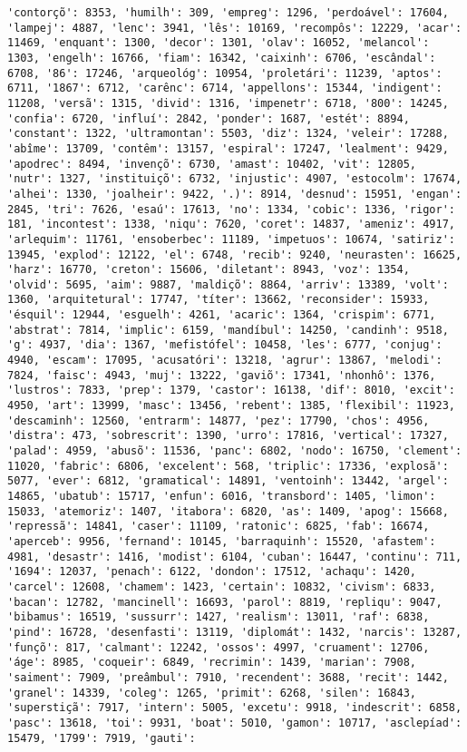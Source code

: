 \documentclass[11pt]{article}
\begin{document}
\begin{Verbatim}[commandchars=\\\{\}]
'contorçõ': 8353, 'humilh': 309, 'empreg': 1296, 'perdoável': 17604, 'lampej': 4887, 'lenc': 3941, 'lês': 10169, 'recompôs': 12229, 'acar': 11469, 'enquant': 1300, 'decor': 1301, 'olav': 16052, 'melancol': 1303, 'engelh': 16766, 'fiam': 16342, 'caixinh': 6706, 'escândal': 6708, '86': 17246, 'arqueológ': 10954, 'proletári': 11239, 'aptos': 6711, '1867': 6712, 'carênc': 6714, 'appellons': 15344, 'indigent': 11208, 'versã': 1315, 'divid': 1316, 'impenetr': 6718, '800': 14245, 'confia': 6720, 'influí': 2842, 'ponder': 1687, 'estét': 8894, 'constant': 1322, 'ultramontan': 5503, 'diz': 1324, 'veleir': 17288, 'abîme': 13709, 'contêm': 13157, 'espiral': 17247, 'lealment': 9429, 'apodrec': 8494, 'invençõ': 6730, 'amast': 10402, 'vit': 12805, 'nutr': 1327, 'instituiçõ': 6732, 'injustic': 4907, 'estocolm': 17674, 'alhei': 1330, 'joalheir': 9422, '.)': 8914, 'desnud': 15951, 'engan': 2845, 'tri': 7626, 'esaú': 17613, 'no': 1334, 'cobic': 1336, 'rigor': 181, 'incontest': 1338, 'niqu': 7620, 'coret': 14837, 'ameniz': 4917, 'arlequim': 11761, 'ensoberbec': 11189, 'impetuos': 10674, 'satiriz': 13945, 'explod': 12122, 'el': 6748, 'recib': 9240, 'neurasten': 16625, 'harz': 16770, 'creton': 15606, 'diletant': 8943, 'voz': 1354, 'olvid': 5695, 'aim': 9887, 'maldiçõ': 8864, 'arriv': 13389, 'volt': 1360, 'arquitetural': 17747, 'títer': 13662, 'reconsider': 15933, 'ésquil': 12944, 'esguelh': 4261, 'acaric': 1364, 'crispim': 6771, 'abstrat': 7814, 'implic': 6159, 'mandíbul': 14250, 'candinh': 9518, 'g': 4937, 'dia': 1367, 'mefistófel': 10458, 'les': 6777, 'conjug': 4940, 'escam': 17095, 'acusatóri': 13218, 'agrur': 13867, 'melodi': 7824, 'faisc': 4943, 'muj': 13222, 'gaviõ': 17341, 'nhonhô': 1376, 'lustros': 7833, 'prep': 1379, 'castor': 16138, 'dif': 8010, 'excit': 4950, 'art': 13999, 'masc': 13456, 'rebent': 1385, 'flexibil': 11923, 'descaminh': 12560, 'entrarm': 14877, 'pez': 17790, 'chos': 4956, 'distra': 473, 'sobrescrit': 1390, 'urro': 17816, 'vertical': 17327, 'palad': 4959, 'abusõ': 11536, 'panc': 6802, 'nodo': 16750, 'clement': 11020, 'fabric': 6806, 'excelent': 568, 'triplic': 17336, 'explosã': 5077, 'ever': 6812, 'gramatical': 14891, 'ventoinh': 13442, 'argel': 14865, 'ubatub': 15717, 'enfun': 6016, 'transbord': 1405, 'limon': 15033, 'atemoriz': 1407, 'itabora': 6820, 'as': 1409, 'apog': 15668, 'repressã': 14841, 'caser': 11109, 'ratonic': 6825, 'fab': 16674, 'aperceb': 9956, 'fernand': 10145, 'barraquinh': 15520, 'afastem': 4981, 'desastr': 1416, 'modist': 6104, 'cuban': 16447, 'continu': 711, '1694': 12037, 'penach': 6122, 'dondon': 17512, 'achaqu': 1420, 'carcel': 12608, 'chamem': 1423, 'certain': 10832, 'civism': 6833, 'bacan': 12782, 'mancinell': 16693, 'parol': 8819, 'repliqu': 9047, 'bibamus': 16519, 'sussurr': 1427, 'realism': 13011, 'raf': 6838, 'pind': 16728, 'desenfasti': 13119, 'diplomát': 1432, 'narcis': 13287, 'funçõ': 817, 'calmant': 12242, 'ossos': 4997, 'cruament': 12706, 'áge': 8985, 'coqueir': 6849, 'recrimin': 1439, 'marian': 7908, 'saiment': 7909, 'preâmbul': 7910, 'recendent': 3688, 'recit': 1442, 'granel': 14339, 'coleg': 1265, 'primit': 6268, 'silen': 16843, 'superstiçã': 7917, 'intern': 5005, 'excetu': 9918, 'indescrit': 6858, 'pasc': 13618, 'toi': 9931, 'boat': 5010, 'gamon': 10717, 'asclepíad': 15479, '1799': 7919, 'gauti': 
\end{Verbatim}
\end{document}
